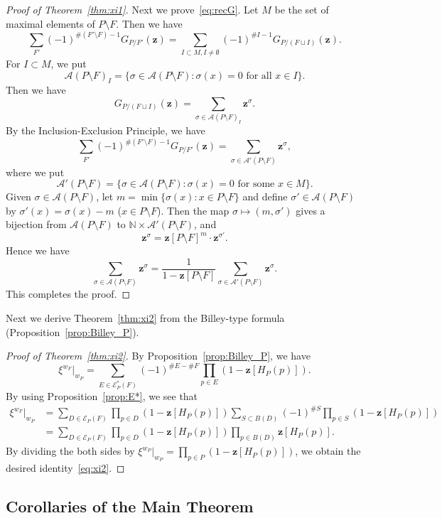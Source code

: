 \documentclass[10pt]{amsart}
\theoremstyle{definition}
\theoremstyle{remark}
\newcommand\vectz{\boldsymbol{z}}
\newcommand\Nat{\mathbb{N}}
\newcommand\AP{\mathcal{A}}
\newcommand\EE{\mathcal{E}}
\begin{document}
\begin{proof}[Proof of Theorem~\ref{thm:xi1}]
Next we prove~\eqref{eq:recG}.
Let $M$ be the set of maximal elements of $P \setminus F$.
Then we have
$$
\sum_{F'}
 (-1)^{\# (F' \setminus F) -1 }
 G_{P/F'}(\vectz)
 =
\sum_{I \subset M, I \neq \emptyset}
 (-1)^{\# I - 1}
 G_{P/(F \sqcup I)}(\vectz).
$$
For $I \subset M$, we put
$$
\AP(P \setminus F)_I 
 =
\{ \sigma \in \AP(P \setminus F) : \sigma(x) = 0 \text{ for all $x \in I$} \}.
$$
Then we have
$$
G_{P/(F \sqcup I)}(\vectz) = \sum_{\sigma \in \AP(P \setminus F)_I} \vectz^\sigma.
$$
By the Inclusion-Exclusion Principle, we have
$$
\sum_{F'}
 (-1)^{\# (F' \setminus F) -1 }
 G_{P/F'}(\vectz)
 =
\sum_{\sigma \in \AP'(P \setminus F)} \vectz^\sigma,
$$
where we put
$$
\AP'(P \setminus F)
 =
\{ \sigma \in \AP(P \setminus F) :
 \text{$\sigma(x) = 0$ for some $x \in M$}
\}.
$$
Given $\sigma \in \AP(P \setminus F)$, let $m = \min \{ \sigma(x) : x \in P \setminus F \}$ 
and define $\sigma' \in \AP(P \setminus F)$ by $\sigma'(x) = \sigma(x) - m$ ($x \in P \setminus F$).
Then the map $\sigma \mapsto (m, \sigma')$ gives a bijection from $\AP(P \setminus F)$ 
to $\Nat \times \AP'(P \setminus F)$, and
$$
\vectz^\sigma = \vectz[P \setminus F]^m \cdot \vectz^{\sigma'}.
$$
Hence we have
$$
\sum_{\sigma \in \AP(P \setminus F)} \vectz^\sigma
 =
\frac{ 1 }
 { 1 - \vectz[P \setminus F] }
\sum_{\sigma \in \AP'(P \setminus F)} \vectz^\sigma.
$$
This completes the proof.
\end{proof}

Next we derive Theorem~\ref{thm:xi2} from the Billey-type formula (Proposition~\ref{prop:Billey_P}).

\begin{proof}[Proof of Theorem~\ref{thm:xi2}]
By Proposition~\ref{prop:Billey_P}, we have
$$
\xi^{w_F}|_{w_P}
 =
\sum_{E \in \EE^*_P(F)}
 (-1)^{\# E - \# F}
 \prod_{p \in E} \left( 1 - \vectz[H_P(p)] \right).
$$
By using Proposition~\ref{prop:E*}, we see that
\begin{align*}
\xi^{w_F}|_{w_P}
 &=
\sum_{D \in \EE_P(F)}
 \prod_{p \in D} \left( 1 - \vectz[H_P(p)] \right)
\sum_{S \subset B(D)}
 (-1)^{\# S}
 \prod_{p \in S} \left( 1 - \vectz[H_P(p)] \right)
\\
 &=
\sum_{D \in \EE_P(F)}
 \prod_{p \in D} \left( 1 - \vectz[H_P(p)] \right)
 \prod_{p \in B(D)} \vectz[H_P(p)].
\end{align*}
By dividing the both sides by $\xi^{w_P}|_{w_P} = \prod_{p \in P} ( 1 - \vectz[H_P(p)] )$, 
we obtain the desired identity~\eqref{eq:xi2}.
\end{proof}

\subsection{%
Corollaries of the Main Theorem
}
\end{document}
